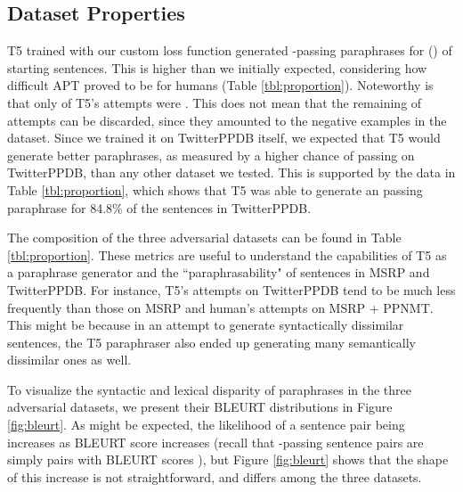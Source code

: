 \subsection{Dataset Properties}
T5 trained with our custom loss function generated -passing paraphrases for () of starting sentences. This is higher than we initially expected, considering how difficult APT proved to be for humans (Table \ref{tbl:proportion}). Noteworthy is that only  of T5's attempts were . This does not mean that the remaining  of attempts can be discarded, since they amounted to the negative examples in the dataset.
Since we trained it on TwitterPPDB itself, we expected that T5 would generate better paraphrases, as measured by a higher chance of passing  on TwitterPPDB, than any other dataset we tested. This is supported by the data in Table \ref{tbl:proportion}, which shows that T5 was able to generate an  passing paraphrase for 84.8\% of the sentences in TwitterPPDB.

The composition of the three adversarial datasets can be found in Table \ref{tbl:proportion}. These metrics are useful to understand the capabilities of T5 as a paraphrase generator and the ``paraphrasability" of sentences in MSRP and TwitterPPDB. For instance, T5's attempts on TwitterPPDB tend to be  much less frequently than those on MSRP and human's attempts on MSRP + PPNMT. This might be because in an attempt to generate syntactically dissimilar sentences, the T5 paraphraser also ended up generating many semantically dissimilar ones as well.

To visualize the syntactic and lexical disparity of paraphrases in the three adversarial datasets, we present their BLEURT distributions in Figure \ref{fig:bleurt}. As might be expected, the likelihood of a sentence pair being  increases as BLEURT score increases (recall that -passing sentence pairs are simply  pairs with BLEURT scores ), but Figure \ref{fig:bleurt} shows that the shape of this increase is not straightforward, and differs among the three datasets. 



